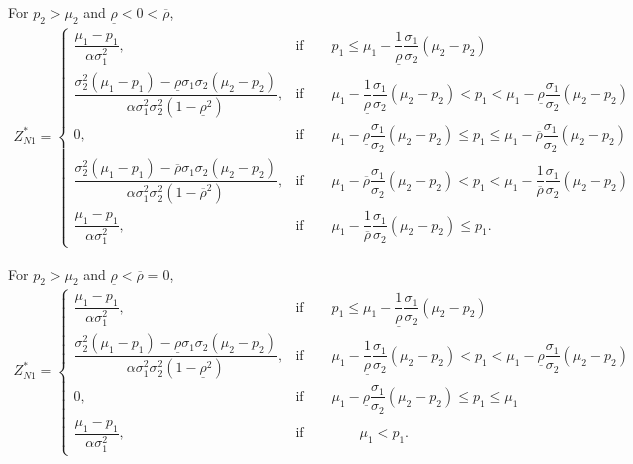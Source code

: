 \documentclass[10pt]{article}
\begin{document}
For $ p_2 > \mu_2 $ and $ \underline{\rho} < 0 < \overline{\rho} $,
{\footnotesize \begin{eqnarray}
Z_{N 1}^* = \left\{ \begin{matrix}
\dfrac{\mu_1 - p_1}{\alpha \sigma_1^2}, & \text{if} \qquad p_1 \leqslant \mu_1 - \dfrac1{\underline{\rho}} \dfrac{\sigma_1}{\sigma_2} (\mu_2 - p_2) \\
\dfrac{\sigma_2^2 (\mu_1 - p_1) - \underline{\rho} \sigma_1 \sigma_2 (\mu_2 - p_2)}{\alpha \sigma_1^2 \sigma_2^2 (1 - \underline{\rho}^2)}, & \text{if} \qquad \mu_1 - \dfrac1{\underline{\rho}} \dfrac{\sigma_1}{\sigma_2} (\mu_2 - p_2) < p_1 < \mu_1 - \underline{\rho} \dfrac{\sigma_1}{\sigma_2} (\mu_2 - p_2) \\
0, & \text{if} \qquad \mu_1 - \underline{\rho} \dfrac{\sigma_1}{\sigma_2} (\mu_2 - p_2) \leqslant p_1 \leqslant \mu_1 - \overline{\rho} \dfrac{\sigma_1}{\sigma_2} (\mu_2 - p_2) \\
\dfrac{\sigma_2^2 (\mu_1 - p_1) - \overline{\rho} \sigma_1 \sigma_2 (\mu_2 - p_2)}{\alpha \sigma_1^2 \sigma_2^2 (1 - \overline{\rho}^2)}, & \text{if} \qquad \mu_1 - \overline{\rho} \dfrac{\sigma_1}{\sigma_2} (\mu_2 - p_2) < p_1 < \mu_1 - \dfrac1{\overline{\rho}} \dfrac{\sigma_1}{\sigma_2} (\mu_2 - p_2) \\
\dfrac{\mu_1 - p_1}{\alpha \sigma_1^2}, & \text{if} \qquad \mu_1 - \dfrac1{\overline{\rho}} \dfrac{\sigma_1}{\sigma_2} (\mu_2 - p_2) \leqslant p_1.
\end{matrix} \right.
\end{eqnarray}}

For $ p_2 > \mu_2 $ and $ \underline{\rho} < \overline{\rho} = 0 $,
{\footnotesize \begin{eqnarray}
Z_{N 1}^* = \left\{ \begin{matrix}
\dfrac{\mu_1 - p_1}{\alpha \sigma_1^2}, & \text{if} \qquad p_1 \leqslant \mu_1 - \dfrac1{\underline{\rho}} \dfrac{\sigma_1}{\sigma_2} (\mu_2 - p_2) \\
\dfrac{\sigma_2^2 (\mu_1 - p_1) - \underline{\rho} \sigma_1 \sigma_2 (\mu_2 - p_2)}{\alpha \sigma_1^2 \sigma_2^2 (1 - \underline{\rho}^2)}, & \text{if} \qquad \mu_1 - \dfrac1{\underline{\rho}} \dfrac{\sigma_1}{\sigma_2} (\mu_2 - p_2) < p_1 < \mu_1 - \underline{\rho} \dfrac{\sigma_1}{\sigma_2} (\mu_2 - p_2) \\
0, & \text{if} \qquad \mu_1 - \underline{\rho} \dfrac{\sigma_1}{\sigma_2} (\mu_2 - p_2) \leqslant p_1 \leqslant \mu_1 \\
\dfrac{\mu_1 - p_1}{\alpha \sigma_1^2}, & \text{if} \qquad \qquad \mu_1 < p_1.
\end{matrix} \right.
\end{eqnarray}}
\end{document}
